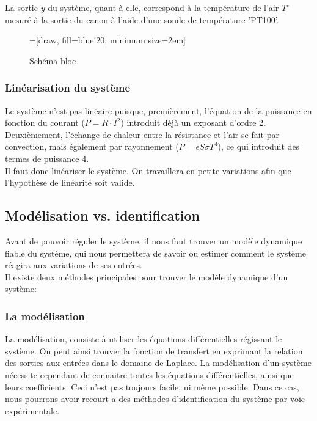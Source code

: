 La sortie $y$ du système, quant à elle, correspond à la température de l'air $T^\circ$
mesuré à la sortie du canon à l'aide d'une sonde de température 'PT100'.\\ 

\begin{figure}[H]	
    \centering
    =[draw, fill=blue!20, minimum size=2em]
    \caption{Schéma bloc}
\end{figure}

\subsubsection{Linéarisation du système}
Le système n'est pas linéaire puisque, premièrement, l'équation de la puissance en fonction
du courant ($P = R \cdot I^2$) introduit déjà un exposant d'ordre 2. 
Deuxièmement, l'échange de chaleur entre la résistance et l'air se fait par convection, 
mais également par rayonnement ($P = \epsilon S \sigma T^4$), ce qui introduit des termes
de puissance 4.\\

Il faut donc linéariser le système. On travaillera en petite variations afin que
l'hypothèse de linéarité soit valide.
 
\subsection{Modélisation vs. identification}
Avant de pouvoir réguler le système, il nous faut trouver un modèle dynamique fiable
du système, qui nous permettera de savoir ou estimer comment le système réagira aux
variations de ses entrées.\\

Il existe deux méthodes principales pour trouver le modèle dynamique d'un système: 
\subsubsection{La modélisation}
La modélisation, consiste à utiliser les équations différentielles régissant le système.
On peut ainsi trouver la fonction de transfert en exprimant la relation des sorties aux 
entrées dans le domaine de Laplace. La modélisation d'un système nécessite cependant de
connaitre toutes les équations différentielles, ainsi que leurs coefficients.
Ceci n'est pas toujours facile, ni même possible. Dans ce cas, nous pourrons avoir recourt
a des méthodes d'identification du système par voie expérimentale.

